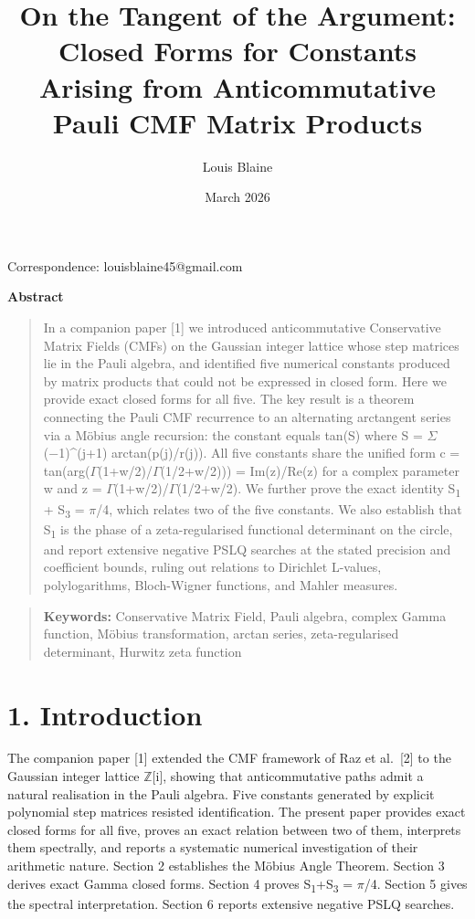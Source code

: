 \documentclass[11pt]{article}
\makeatletter
\renewcommand\maketitle{%
  \begingroup
  \begin{center}
    \LARGE\bfseries \@title \par
  \end{center}
  \ifx\@subtitle\@empty\else
    \vspace{0.4em}
    \begin{center}
      \itshape \@subtitle \par
    \end{center}
  \fi
  \vspace{0.6em}
  \begin{center}
    \@author \par
    \vspace{0.2em}
    Correspondence: \@correspondence \par
    \vspace{0.2em}
    \@date \par
  \end{center}
  \vspace{1em}
  \endgroup
}
\def\@subtitle{}
\def\@correspondence{}
\newcommand{\correspondenceX}[1]{\def\@correspondence{#1}}
\renewenvironment{abstract}{%
  \begin{center}\bfseries Abstract\end{center}%
  \begin{quote}\setlength{\parindent}{0pt}}{\end{quote}\medskip}
\newcommand{\keywordsX}[1]{%
  \begin{quote}\setlength{\parindent}{0pt}\textbf{Keywords:} #1\end{quote}}
\makeatother
\begin{document}
\title{On the Tangent of the Argument: Closed Forms for Constants
Arising from Anticommutative Pauli CMF Matrix Products}

\author{Louis Blaine}
\correspondenceX{louisblaine45@gmail.com}
\date{March 2026}

\maketitle

\begin{abstract}
In a companion paper {[}1{]} we introduced anticommutative Conservative
Matrix Fields (CMFs) on the Gaussian integer lattice whose step matrices
lie in the Pauli algebra, and identified five numerical constants
produced by matrix products that could not be expressed in closed form.
Here we provide exact closed forms for all five. The key result is a
theorem connecting the Pauli CMF recurrence to an alternating arctangent
series via a Möbius angle recursion: the constant equals
\textbar tan(S)\textbar{} where S = \(\Sigma\)(−1)\^{}(j+1)
arctan(p(j)/r(j)). All five constants share the unified form c =
\textbar tan(arg(\(\Gamma\)(1+w/2)/\(\Gamma\)(1/2+w/2)))\textbar{} =
\textbar Im(z)/Re(z)\textbar{} for a complex parameter w and z =
\(\Gamma\)(1+w/2)/\(\Gamma\)(1/2+w/2). We further prove the exact
identity S\textsubscript{1} + S\textsubscript{3} = \(\pi\)/4, which
relates two of the five constants. We also establish that
S\textsubscript{1} is the phase of a zeta-regularised functional
determinant on the circle, and report extensive negative PSLQ searches
at the stated precision and coefficient bounds, ruling out relations to
Dirichlet L-values, polylogarithms, Bloch-Wigner functions, and Mahler
measures.
\end{abstract}

\keywordsX{Conservative Matrix Field, Pauli algebra, complex Gamma
function, Möbius transformation, arctan series, zeta-regularised
determinant, Hurwitz zeta function}

\hypertarget{introduction}{%
\section{1. Introduction}\label{introduction}}

The companion paper {[}1{]} extended the CMF framework of Raz et
al.~{[}2{]} to the Gaussian integer lattice \(\mathbb{Z}\){[}i{]},
showing that anticommutative paths admit a natural realisation in the
Pauli algebra. Five constants generated by explicit polynomial step
matrices resisted identification. The present paper provides exact
closed forms for all five, proves an exact relation between two of them,
interprets them spectrally, and reports a systematic numerical
investigation of their arithmetic nature. Section 2 establishes the
Möbius Angle Theorem. Section 3 derives exact Gamma closed forms.
Section 4 proves S\textsubscript{1}+S\textsubscript{3} = \(\pi\)/4.
Section 5 gives the spectral interpretation. Section 6 reports extensive
negative PSLQ searches.
\end{document}
